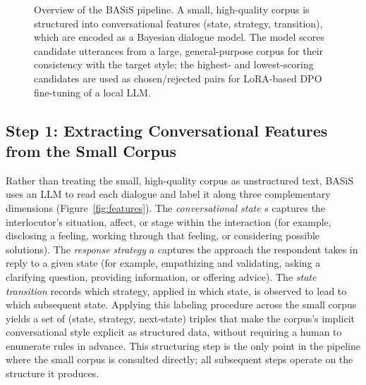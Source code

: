 \documentclass[manuscript,review,anonymous]{acmart}
\begin{document}
\begin{figure}[t]
  \centering
  \caption{Overview of the BASiS pipeline. A small, high-quality corpus is structured into conversational features (state, strategy, transition), which are encoded as a Bayesian dialogue model. The model scores candidate utterances from a large, general-purpose corpus for their consistency with the target style; the highest- and lowest-scoring candidates are used as chosen/rejected pairs for LoRA-based DPO fine-tuning of a local LLM.}
  \label{fig:pipeline}
\end{figure}

\subsection{Step 1: Extracting Conversational Features from the Small Corpus}
Rather than treating the small, high-quality corpus as unstructured text, BASiS uses an LLM to read each dialogue and label it along three complementary dimensions (Figure~\ref{fig:features}). The \emph{conversational state} $s$ captures the interlocutor's situation, affect, or stage within the interaction (for example, disclosing a feeling, working through that feeling, or considering possible solutions). The \emph{response strategy} $a$ captures the approach the respondent takes in reply to a given state (for example, empathizing and validating, asking a clarifying question, providing information, or offering advice). The \emph{state transition} records which strategy, applied in which state, is observed to lead to which subsequent state. Applying this labeling procedure across the small corpus yields a set of (state, strategy, next-state) triples that make the corpus's implicit conversational style explicit as structured data, without requiring a human to enumerate rules in advance. This structuring step is the only point in the pipeline where the small corpus is consulted directly; all subsequent steps operate on the structure it produces.
\end{document}
